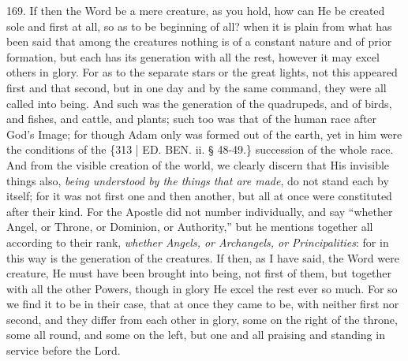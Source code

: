 169. If then the Word be a
mere creature, as you hold, how can He be created sole and first at
all, so as to be beginning of all? when it is plain from what has been
said that among the creatures nothing is of a constant nature and of
prior formation, but each has its generation with all the rest,
however it may excel others in glory. For as to the separate stars or
the great lights, not this appeared first and that second, but in one
day and by the same command, they were all called into being. And such
was the generation of the quadrupeds, and of birds, and fishes, and
cattle, and plants; such too was that of the human race after God's
Image; for though Adam only was formed out of the earth, yet in him
were the conditions of the \{313 | ED. BEN.
ii. § 48-49.\} succession of the whole race. And from the visible creation
of the world, we clearly discern that His invisible things also, \emph{being
understood by the things that are made}, do not stand each by
itself; for it was not first one and then another, but all at once
were constituted after their kind. For the Apostle did not number
individually, and say ``whether Angel, or Throne, or Dominion, or
Authority,'' but he mentions together all according to their rank, \emph{whether
Angels, or Archangels, or Principalities}: for in this way is the
generation of the creatures. If then, as I have said, the Word were
creature, He must have been brought into being, not first of them, but
together with all the other Powers, though in glory He excel the rest
ever so much. For so we find it to be in their case, that at once they
came to be, with neither first nor second, and they differ from each
other in glory, some on the right of the throne, some all round, and
some on the left, but one and all praising and standing in service
before the Lord.

